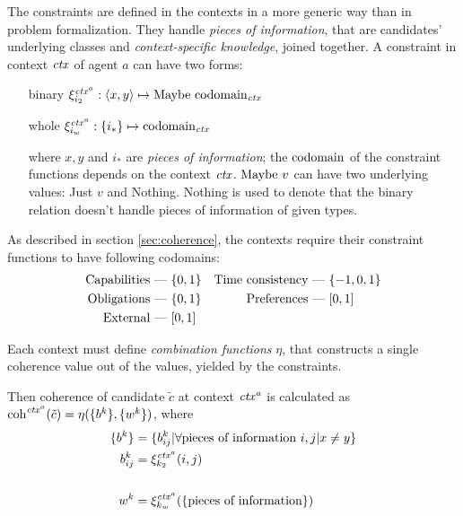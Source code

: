 The constraints are defined in the contexts in a more generic way than in problem
formalization. They handle \emph{pieces of information},
that are candidates' underlying classes and \emph{context-specific knowledge},
joined together.
A constraint in context $\mathit{ctx}$ of agent $a$ can have two forms:
\begin{itemize}[leftmargin=2cm]
  \item[binary] $ \xi_{i_2}^{\mathit{ctx}^a} : \left< x,y \right> \mapsto \mathrm{Maybe~} \mathrm{codomain}_{\mathit{ctx}} $
  \item[whole]  $ \xi_{i_w}^{\mathit{ctx}^a} : \{i_*\} \mapsto \mathrm{codomain}_{\mathit{ctx}} $
  \item[] where $x, y$ and $i_*$ are \emph{pieces of information};
    the $\mathrm{codomain}$ of the constraint functions depends on the context $\mathit{ctx}$.
    $\mathrm{Maybe~} v$ can have two underlying values: Just $v$ and Nothing.
    Nothing is used to denote that the binary relation doesn't handle pieces of information
    of given types.
\end{itemize}

As described in section \ref{sec:coherence}, the contexts require their
constraint functions to have following codomains:
\begin{align*}
   \text{Capabilities}      &\hbox{ --- } \{0, 1\}
&  \text{Time consistency}  &\hbox{ --- } \{-1, 0, 1\}
\\ \text{Obligations}       &\hbox{ --- } \{0, 1\}
&  \text{Preferences}       &\hbox{ --- } [0, 1]
\\ \text{External}          &\hbox{ --- } [0, 1] &
\end{align*}


Each context must define \emph{combination functions} $\eta$, that constructs a
single coherence value out of the values, yielded by the constraints.

Then coherence of candidate $\tilde c$ at context $\mathit{ctx}^a$
is calculated as \\ $\mathrm{coh}^{\mathit{ctx}^a}(\tilde c) = \eta(\{b^k\}, \{w^k\})$, where
\begin{align*}
  \{b^k\}  &= \{b_{ij}^k | \forall \text{pieces of information } i, j | x \not= y \} \\
  b_{ij}^k &= \xi_{k_2}^{\mathit{ctx}^a}(i,j) \\
  &\\
  w^k      &= \xi_{k_w}^{\mathit{ctx}^a}(\{\text{pieces of information}\})
\end{align*}

\todo{}

\medskip

